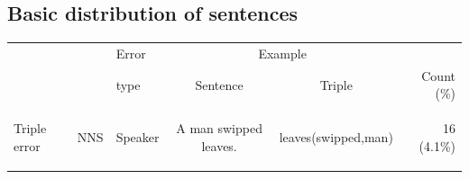 \subsection{Basic distribution of sentences}
\label{sec:sentence-distribution}

\begin{table}[htb!]
\begin{center}
\setlength{\tabcolsep}{.3em}
\begin{tabular}{|l|l|l|cc|r|}
  \hline
  & & Error & \multicolumn{2}{c|}{Example} &  \\
  & & type & Sentence & Triple & Count (\%)\\
  \hline
  \hline
  \multirow{8}{*}{\begin{sideways}Triple error\end{sideways}} &
  \multirow{4}{*}{\begin{sideways}NNS\end{sideways}} & Speaker & A man swipped leaves. & leaves(swipped,man) & 16 (4.1\%) \\


\end{tabular}
\end{center}
\end{table}
